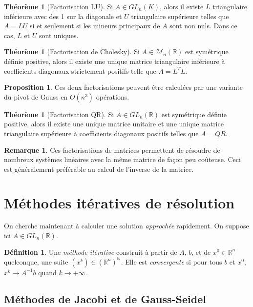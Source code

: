 \documentclass[11pt,a4paper,twocolumn]{article}
\theoremstyle{definition}
\newtheorem{definition}[equation]{Définition}
\newtheorem{proposition}[equation]{Proposition}
\newtheorem{theorem}[equation]{Théorème}
\newtheorem{remark}[equation]{Remarque}
\newcounter{n}
\def\N{\mathbb{N}}
\def\R{\mathbb{R}}
\def\M{\mathcal{M}}
\begin{document}
\begin{theorem}[Factorisation LU]
  Si $A \in GL_n(K)$, alors il existe $L$ triangulaire inférieure avec des 1 sur
  la diagonale et $U$ triangulaire supérieure telles que $A = LU$ si et
  seulement si les mineurs principaux de $A$ sont non nuls. Dans ce cas, $L$ et
  $U$ sont uniques.
\end{theorem}
\begin{theorem}[Factorisation de Cholesky]
  Si $A \in \M_n(\R)$ est symétrique définie positive, alors il existe une
  unique matrice triangulaire inférieure à coefficients diagonaux strictement
  positifs telle que $A = L^T L$.
\end{theorem}
\begin{proposition}
  Ces deux factorisations peuvent être calculées par une variante du pivot de
  Gauss en $O(n^3)$ opérations.
\end{proposition}
\begin{theorem}[Factorisation QR]
  Si $A \in GL_n(\R)$ est symétrique définie positive, alors il existe une
  unique matrice unitaire et une unique matrice triangulaire supérieure à
  coefficients diagonaux positifs telles que $A = QR$.
\end{theorem}
\begin{remark}
  Ces factorisations de matrices permettent de résoudre de nombreux systèmes
  linéaires avec la même matrice de façon peu coûteuse. Ceci est généralement
  préférable au calcul de l'inverse de la matrice.
\end{remark}

\section{Méthodes itératives de résolution}

On cherche maintenant à calculer une solution \emph{approchée} rapidement.
On suppose ici $A \in GL_n(\R)$.

\begin{definition}
  Une \emph{méthode itérative} construit à partir de $A$, $b$, et de $x^0 \in
  \R^n$ quelconque, une suite $(x^k) \in (\R^n)^\N$. Elle est \emph{convergente}
  si pour tous $b$ et $x^0$, $x^k \longrightarrow A^{-1}b$ quand $k \to
  +\infty$.
\end{definition}

\subsection{Méthodes de Jacobi et de Gauss-Seidel}
\end{document}
